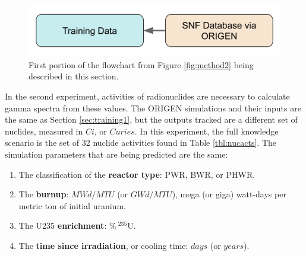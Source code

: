 \begin{figure}[H]
  \centering
  \includegraphics[width=0.7\linewidth]{./chapters/exp2/methodology2_1.png}
  \caption{First portion of the flowchart from Figure \ref{fig:method2} being 
           described in this section.}
\end{figure}

In the second experiment, activities of radionuclides are necessary to
calculate gamma spectra from these values. The \gls{ORIGEN} simulations and
their inputs are the same as Section \ref{sec:training1}, but the outputs
tracked are a different set of nuclides, measured in $Ci$, or $Curies$.  In
this experiment, the full knowledge scenario is the set of 32 nuclide
activities found in Table \ref{tbl:nucacts}.  The simulation parameters that
are being predicted are the same:
\begin{enumerate}
  \item The classification of the \textbf{reactor type}: \gls{PWR}, \gls{BWR}, 
        or \gls{PHWR}.
  \item The \textbf{burnup}: $MWd/MTU$ (or $GWd/MTU$), mega (or giga) 
        watt-days per metric ton of initial uranium.
  \item The \gls{U235} \textbf{enrichment}: $\%\:{}^{235}\text{U}$. 
  \item The \textbf{time since irradiation}, or cooling time: $days$ (or $years$).
\end{enumerate}

